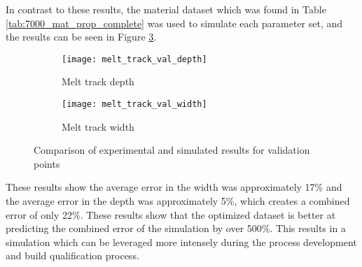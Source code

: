 In contrast to these results, the material dataset which was found in Table \ref{tab:7000_mat_prop_complete} was used to simulate each parameter set, and the results can be seen in Figure \ref{fig:melt_track_val}.
\begin{figure}[!htb]\centering
	\begin{subfigure}[c]{0.45\textwidth}\centering
	\texttt{[image: melt\_track\_val\_depth]}
	\caption{Melt track depth}
	\label{fig:melt_track_val_depth}
	\end{subfigure}\hfill{}
		\begin{subfigure}[c]{0.45\textwidth}\centering
		\texttt{[image: melt\_track\_val\_width]}
		\caption{Melt track width}
		\label{fig:melt_track_val_width}
		\end{subfigure}
	\caption{Comparison of experimental and simulated results for validation points}
	\label{fig:melt_track_val}
\end{figure}
These results show the average error in the width was approximately 17\% and the average error in the depth was approximately 5\%, which creates a combined error of only 22\%.  These results show that the optimized dataset is better at predicting the combined error of the simulation by over 500\%.  This results in a simulation which can be leveraged more intensely during the process development and build qualification process.  

